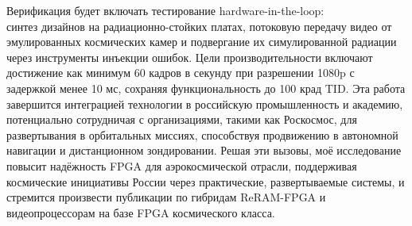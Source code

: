 \documentclass[a4paper,11pt]{article}
\begin{document}
\vspace{10pt}

Верификация будет включать тестирование hardware-in-the-loop: \\ синтез дизайнов на радиационно-стойких платах, потоковую передачу видео от эмулированных космических камер и подвергание их симулированной радиации через инструменты инъекции ошибок. Цели производительности включают достижение как минимум 60 кадров в секунду при разрешении 1080p с задержкой менее 10 мс, сохраняя функциональность до 100 крад TID. Эта работа завершится интеграцией технологии в российскую промышленность и академию, потенциально сотрудничая с организациями, такими как Роскосмос, для развертывания в орбитальных миссиях, способствуя продвижению в автономной навигации и дистанционном зондировании. Решая эти вызовы, моё исследование повысит надёжность FPGA для аэрокосмической отрасли, поддерживая космические инициативы России через практические, развертываемые системы, и стремится произвести публикации по гибридам ReRAM-FPGA и видеопроцессорам на базе FPGA космического класса.
\end{document}

